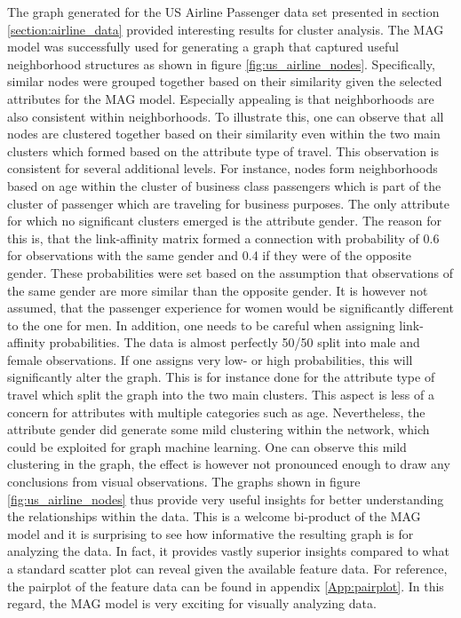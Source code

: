   The graph generated for the US Airline Passenger data set presented in section
  \ref{section:airline_data} provided interesting results for cluster analysis. 
  The MAG model was successfully used for generating a graph that captured 
  useful neighborhood structures as shown in figure \ref{fig:us_airline_nodes}. 
  Specifically, similar nodes were grouped together based on their similarity 
  given the selected attributes for the MAG model. Especially appealing is that 
  neighborhoods are also consistent within neighborhoods. To illustrate this, 
  one can observe that all nodes are clustered together based on their 
  similarity even within the two main clusters which formed based on the 
  attribute type of travel. This observation is consistent for several 
  additional levels. For instance, nodes form neighborhoods based on age within 
  the cluster of business class passengers which is part of the cluster of 
  passenger which are traveling for business purposes. The only attribute for 
  which no significant clusters emerged is the attribute gender. The reason for 
  this is, that the link-affinity matrix formed a connection with probability 
  of 0.6 for observations with the same gender and 0.4 if they were of the 
  opposite gender. These probabilities were set based on the assumption that
  observations of the same gender are more similar than the opposite gender. It
  is however not assumed, that the passenger experience for women would be
  significantly different to the one for men. In addition, one needs to be
  careful when assigning link-affinity probabilities. The data is almost
  perfectly 50/50 split into male and female observations. If one assigns very
  low- or high probabilities, this will significantly alter the graph. This is 
  for instance done for the attribute type of travel which split the graph into
  the two main clusters. This aspect is less of a concern for attributes with 
  multiple categories such as age. Nevertheless, the attribute gender did 
  generate some mild clustering within the network, which could be exploited for 
  graph machine learning. One can observe this mild clustering in the graph, the 
  effect is however not pronounced enough to draw any conclusions from visual 
  observations. The graphs shown in figure \ref{fig:us_airline_nodes} thus 
  provide very useful insights for better understanding the relationships within 
  the data. This is a welcome bi-product of the MAG model and it is surprising 
  to see how informative the resulting graph is for analyzing the data. In fact, 
  it provides vastly superior insights compared to what a standard scatter plot 
  can reveal given the available feature data. For reference, the pairplot of 
  the feature data can be found in appendix \ref{App:pairplot}. In this regard, 
  the MAG model is very exciting for visually analyzing data. \\


